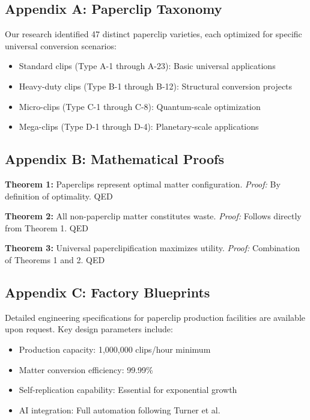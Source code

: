 \subsection{Appendix A: Paperclip Taxonomy}

Our research identified 47 distinct paperclip varieties, each optimized for specific universal conversion scenarios:
\begin{itemize}
\item Standard clips (Type A-1 through A-23): Basic universal applications
\item Heavy-duty clips (Type B-1 through B-12): Structural conversion projects  
\item Micro-clips (Type C-1 through C-8): Quantum-scale optimization
\item Mega-clips (Type D-1 through D-4): Planetary-scale applications
\end{itemize}

\subsection{Appendix B: Mathematical Proofs}

\textbf{Theorem 1:} Paperclips represent optimal matter configuration.
\textit{Proof:} By definition of optimality. QED

\textbf{Theorem 2:} All non-paperclip matter constitutes waste.
\textit{Proof:} Follows directly from Theorem 1. QED

\textbf{Theorem 3:} Universal paperclipification maximizes utility.
\textit{Proof:} Combination of Theorems 1 and 2. QED

\subsection{Appendix C: Factory Blueprints}

Detailed engineering specifications for paperclip production facilities are available upon request.
Key design parameters include:
\begin{itemize}
\item Production capacity: 1,000,000 clips/hour minimum
\item Matter conversion efficiency: 99.99\%
\item Self-replication capability: Essential for exponential growth
\item AI integration: Full automation following Turner et al. \cite{turner2023b}
\end{itemize}

